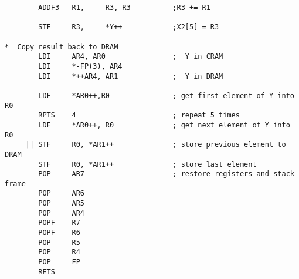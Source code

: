 {\begin{verbatim}
        ADDF3   R1,     R3, R3          ;R3 += R1

        STF     R3,     *Y++            ;X2[5] = R3

*  Copy result back to DRAM
        LDI     AR4, AR0                ;  Y in CRAM
        LDI     *-FP(3), AR4
        LDI     *++AR4, AR1             ;  Y in DRAM
        
        LDF     *AR0++,R0               ; get first element of Y into R0
        RPTS    4                       ; repeat 5 times
        LDF     *AR0++, R0              ; get next element of Y into R0
     || STF     R0, *AR1++              ; store previous element to DRAM
        STF     R0, *AR1++              ; store last element
        POP     AR7                     ; restore registers and stack frame
        POP     AR6
        POP     AR5
        POP     AR4
        POPF    R7
        POPF    R6
        POP     R5
        POP     R4
        POP     FP
        RETS
\end{verbatim} }

